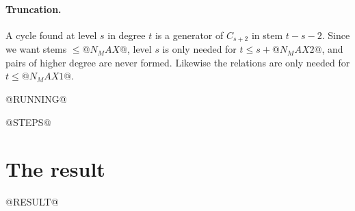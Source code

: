 \documentclass[11pt]{article}
\begin{document}
\paragraph{Truncation.}
A cycle found at level $s$ in degree $t$ is a generator of $C_{s+2}$ in stem $t-s-2$. Since we
want stems $\le @N_MAX@$, level $s$ is only needed for $t \le s + @N_MAX2@$, and pairs of higher degree are
never formed. Likewise the relations are only needed for $t \le @N_MAX1@$.

@RUNNING@

@STEPS@

\section{The result}

@RESULT@
\end{document}
